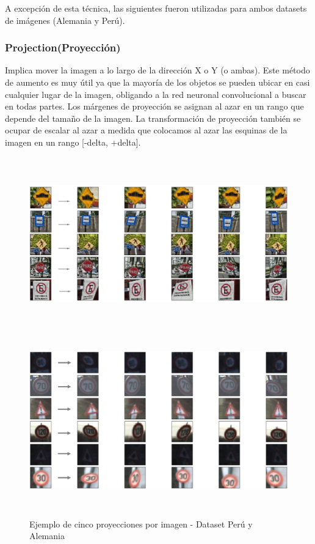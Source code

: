 		A excepción de esta técnica, las siguientes fueron utilizadas para ambos datasets de imágenes (Alemania y Perú).
		
		\subsubsection{Projection(Proyección)}
			Implica mover la imagen a lo largo de la dirección X o Y (o ambas). Este método de aumento es muy útil ya que la mayoría de los objetos se pueden ubicar en casi cualquier lugar de la imagen, obligando a la red neuronal convolucional a buscar en todas partes. Los márgenes de proyección se asignan al azar en un rango que depende del tamaño de la imagen. La transformación de proyección también se ocupar de escalar al azar a medida que colocamos al azar las esquinas de la imagen en un rango [-delta, +delta].

			\begin{figure}[H]
				\begin{center}
				\includegraphics[width=1\textwidth,height=7.5cm]{images/desarrollo/Augment/projection_transform3}
				\includegraphics[width=1\textwidth,height=7.5cm]{images/desarrollo/Augment/projection_transform}
				\end{center}
				\begin{center}
				\vspace{1em}
				\caption{\small{Ejemplo de cinco proyecciones por imagen - Dataset Perú y Alemania}}	
				{\small{\fontsize{10}{16.8}\selectfont {Fuente: Elaboración propia}}}
				\end{center}
				\vspace{-1.5em}
			\end{figure}
		\newpage
